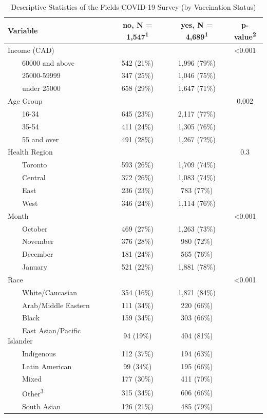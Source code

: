 \documentclass[
  letterpaper,
  DIV=11,
  numbers=noendperiod]{scrartcl}
\begin{document}
\hypertarget{tbl-descriptive-stats}{}
\setlength{\LTpost}{0mm}
\begin{longtable}{lccc}
\caption{\label{tbl-descriptive-stats}Descriptive Statistics of the Fields COVID-19 Survey (by Vaccination
Status) }\tabularnewline

\toprule
\textbf{Variable} & \textbf{no}, N = 1,547\textsuperscript{1} & \textbf{yes}, N = 4,689\textsuperscript{1} & \textbf{p-value}\textsuperscript{2} \\ 
\midrule
Income (CAD) &  &  & <0.001 \\ 
    60000 and above & 542 (21\%) & 1,996 (79\%) &  \\ 
    25000-59999 & 347 (25\%) & 1,046 (75\%) &  \\ 
    under 25000 & 658 (29\%) & 1,647 (71\%) &  \\ 
Age Group &  &  & 0.002 \\ 
    16-34 & 645 (23\%) & 2,117 (77\%) &  \\ 
    35-54 & 411 (24\%) & 1,305 (76\%) &  \\ 
    55 and over & 491 (28\%) & 1,267 (72\%) &  \\ 
Health Region &  &  & 0.3 \\ 
    Toronto & 593 (26\%) & 1,709 (74\%) &  \\ 
    Central & 372 (26\%) & 1,083 (74\%) &  \\ 
    East & 236 (23\%) & 783 (77\%) &  \\ 
    West & 346 (24\%) & 1,114 (76\%) &  \\ 
Month &  &  & <0.001 \\ 
    October & 469 (27\%) & 1,263 (73\%) &  \\ 
    November & 376 (28\%) & 980 (72\%) &  \\ 
    December & 181 (24\%) & 565 (76\%) &  \\ 
    January & 521 (22\%) & 1,881 (78\%) &  \\ 
Race &  &  & <0.001 \\ 
    White/Caucasian & 354 (16\%) & 1,871 (84\%) &  \\ 
    Arab/Middle Eastern & 111 (34\%) & 220 (66\%) &  \\ 
    Black & 159 (34\%) & 303 (66\%) &  \\ 
    East Asian/Pacific Islander & 94 (19\%) & 404 (81\%) &  \\ 
    Indigenous & 112 (37\%) & 194 (63\%) &  \\ 
    Latin American & 99 (34\%) & 195 (66\%) &  \\ 
    Mixed & 177 (30\%) & 411 (70\%) &  \\ 
    Other\textsuperscript{3} & 315 (34\%) & 606 (66\%) &  \\ 
    South Asian & 126 (21\%) & 485 (79\%) &  \\ 
\bottomrule
\end{longtable}
\end{document}
